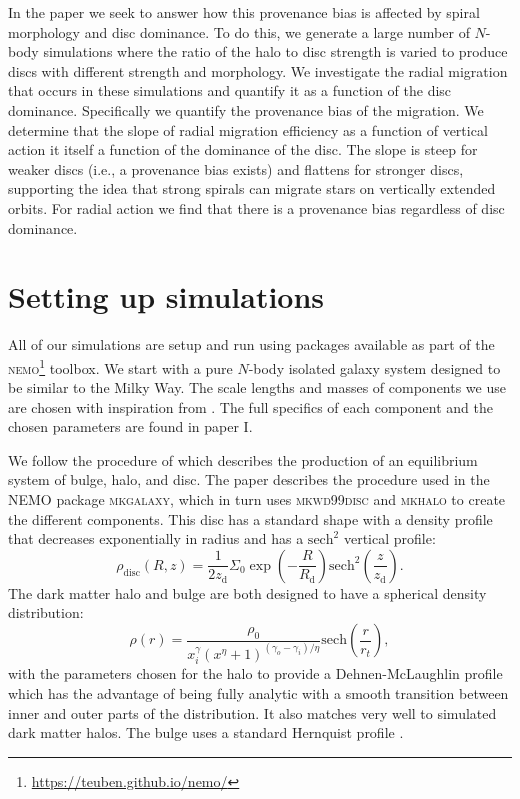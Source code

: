 In the paper we seek to answer how this provenance bias is affected by spiral morphology and disc dominance. To do this, we generate a large number of $N$-body simulations where the ratio of the halo to disc strength is varied to produce discs with different strength and morphology. We investigate the radial migration that occurs in these simulations and quantify it as a function of the disc dominance. Specifically we quantify the provenance bias of the migration. We determine that the slope of radial migration efficiency as a function of vertical action it itself a function of the dominance of the disc. The slope is steep for weaker discs (i.e., a provenance bias exists) and flattens for stronger discs, supporting the idea that strong spirals can migrate stars on vertically extended orbits. For radial action we find that there is a provenance bias regardless of disc dominance. 

\section{Setting up simulations}\label{sec:p1-simulations}
All of our simulations are setup and run using packages available as part of the \textsc{nemo}\footnote{\url{https://teuben.github.io/nemo/}}\citep{teuben:95} toolbox. We start with a pure $N$-body isolated galaxy system designed to be similar to the Milky Way. The scale lengths and masses of components we use are chosen with inspiration from \cite{mcmillan:17}. The full specifics of each component and the chosen parameters are found in paper I.

We follow the procedure of \cite{mcmillan:07} which describes the production of an equilibrium system of bulge, halo, and disc. The paper describes the procedure used in the \textsc{NEMO} package \textsc{mkgalaxy}, which in turn uses \textsc{mkwd99disc} and \textsc{mkhalo} to create the different components. This disc has a standard shape with a density profile that decreases exponentially in radius and has a $\mathrm{sech}^2$ vertical profile:
\begin{equation}
    \rho_\mathrm{disc}(R, z) = \frac{1}{2z_\mathrm{d}} \Sigma_0 \exp\left(-\frac{R}{R_\mathrm{d}}\right) \mathrm{sech}^2\left(\frac{z}{z_\mathrm{d}}\right).
\end{equation}
The dark matter halo and bulge are both designed to have a spherical density distribution:
\begin{equation}
    \rho(r) = \frac{\rho_0}{x^\gamma_i(x^\eta + 1)^{(\gamma_o - \gamma_i)/\eta}} \mathrm{sech}\left(\frac{r}{r_t}\right),
\end{equation}
with the parameters chosen for the halo to provide a Dehnen-McLaughlin profile \citep{dehnen:05} which has the advantage of being fully analytic with a smooth transition between inner and outer parts of the distribution. It also matches very well to simulated dark matter halos. The bulge uses a standard Hernquist profile \citep{hernquist:90}.

